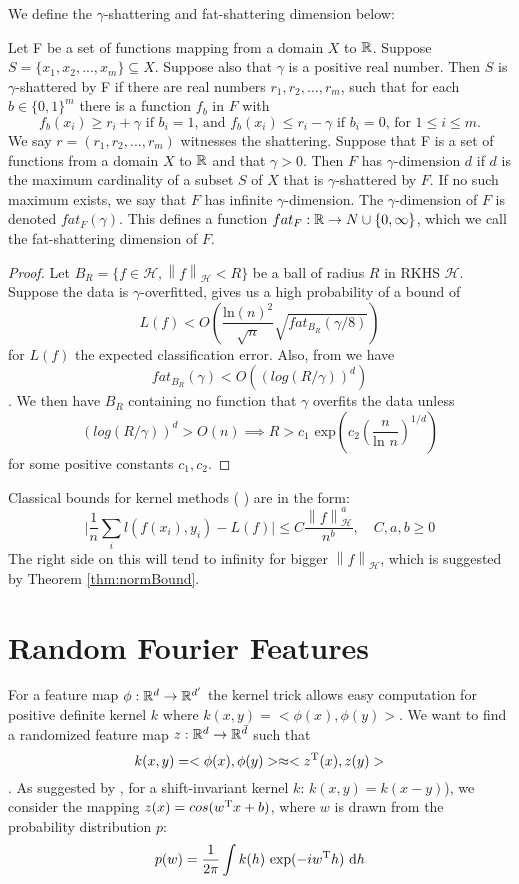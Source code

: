 \documentclass[english]{article}
\newcommand\norm[1]{\left\lVert#1\right\rVert}
\begin{document}
We define the $\gamma$-shattering and fat-shattering dimension below:
\begin{defn}
	Let F be a set of functions mapping from a domain $X$ to $\mathbb{R}$. Suppose $S = \{x_1, x_2, ..., x_m\} \subseteq X$.  Suppose also that $\gamma$ is a positive real number. Then $S$ is $\gamma$-shattered by F if there are real
	numbers $r_1, r_2,..., r_m$, such that for each $b \in \{0, 1\}^m$ there is a function $f_b$ in $F$ with
	\[
	f_b(x_i) \geq r_i + \gamma \text{ if } b_i = 1 \text{, and } f_b(x_i) \leq r_i - \gamma \text{ if } b_i = 0 \text{, for } 1 \leq i \leq m.
	\] We say $r = (r_1, r_2,..., r_m)$ witnesses the shattering.
	Suppose that F is a set of functions from a domain $X$ to $\mathbb{R}$ and that $\gamma > 0$. Then $F$ has $\gamma$-dimension $d$ if $d$ is the maximum	cardinality of a subset $S$ of $X$ that is $\gamma$-shattered by $F$. If no such maximum exists, we say that $F$ has infinite $\gamma$-dimension. The $\gamma$-dimension of $F$ is denoted $fat_F(\gamma)$. This defines a function $fat_F: \mathbb{R} \rightarrow N \cup \{0,\infty\}$, which we call the fat-shattering dimension of $F$.
\end{defn}
\begin{proof}
Let $B_R = \{ f \in \mathcal{H}, \norm{f}_\mathcal{H} < R \}$ be a ball of radius $R$ in RKHS $\mathcal{H}$. Suppose the data is $\gamma$-overfitted, \cite{LossFATBound} gives us a high probability of a bound of
\[ L(f) < O(\frac{\text{ln}(n)^2}{\sqrt{n}}\sqrt{fat_{B_R}(\gamma/8)}) \] for $L(f)$ the expected classification error. Also, from \cite{ApproximationConcentration} we have \[fat_{B_R}(\gamma) < O((log(R/\gamma))^d)\].
We then have $B_R$ containing no function that $\gamma$ overfits the data unless
\[(log(R/\gamma))^d > O(n) \implies R > c_1 \text{ exp}(c_2(\frac{n}{\text{ln }n})^{1/d})\]
for some positive constants $c_1, c_2$.
\end{proof}
Classical bounds for kernel methods (\cite{UnderstandKernel} ) are in the form:
\[ \lvert \frac{1}{n} \sum_{i}l(f(x_i),y_i) - L(f) \rvert \leq C \frac{\norm{f}^a_\mathcal{H}}{n^b}, \hspace{1em} C,a,b \geq 0 \]
The right side on this will tend to infinity for bigger $\norm{f}_\mathcal{H}$, which is suggested by Theorem \ref{thm:normBound}.

\section{Random Fourier Features} \label{sec:RFFs}
For a feature map $\phi: \mathbb{R}^d \rightarrow \mathbb{R}^{d'}$ the kernel trick allows easy computation for positive definite kernel $k$ where $k(x,y) = <\phi(x), \phi(y)>$. We want to find a randomized feature map $z: \mathbb{R}^d \rightarrow \mathbb{R}^{\bar{d}}$ such that 
\[ k(x,y) = <\phi(x), \phi(y)> \approx <z^{\text{T}}(x), z(y)> \].
As suggested by \cite{RFF_Rahimi}, for a shift-invariant kernel $k$: $k(x, y) = k(x - y)$), we consider the mapping $z(x) = cos(w^{\text{T}}x + b)$, where $w$ is drawn from the probability distribution $p$:
\begin{equation}
p(w) = \frac{1}{2\pi} \int k(h) ~ \text{exp}(-iw^{\text{T}}h) ~ \text{d}h
\label{eq:probFourier}
\end{equation} 
 
\end{document}
